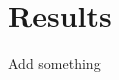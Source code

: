 \documentclass[class=report, crop=false]{standalone}
\begin{document}
\chapter{Results}
\label{chap:results}

Add something
\end{document}
